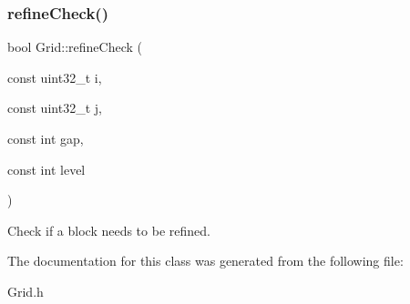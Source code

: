 \subsubsection{\texorpdfstring{refine\+Check()}{refineCheck()}}
{\footnotesize\ttfamily bool Grid\+::refine\+Check (\begin{DoxyParamCaption}\item[{const uint32\+\_\+t}]{i,  }\item[{const uint32\+\_\+t}]{j,  }\item[{const int}]{gap,  }\item[{const int}]{level }\end{DoxyParamCaption})\hspace{0.3cm}{\ttfamily [inline]}}

Check if a block needs to be refined. 

The documentation for this class was generated from the following file\+:\begin{DoxyCompactItemize}
\item 
Grid.\+h\end{DoxyCompactItemize}
